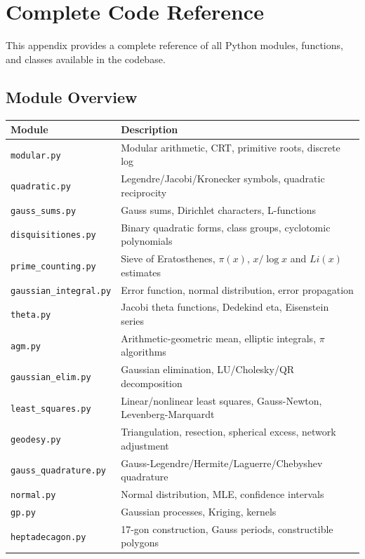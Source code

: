 \chapter{Complete Code Reference}

This appendix provides a complete reference of all Python modules, functions, and classes available in the codebase.

\section{Module Overview}

\begin{table}[H]
\centering
\begin{tabular}{ll}
\toprule
\textbf{Module} & \textbf{Description} \\
\midrule
\texttt{modular.py} & Modular arithmetic, CRT, primitive roots, discrete log \\
\texttt{quadratic.py} & Legendre/Jacobi/Kronecker symbols, quadratic reciprocity \\
\texttt{gauss\_sums.py} & Gauss sums, Dirichlet characters, L-functions \\
\texttt{disquisitiones.py} & Binary quadratic forms, class groups, cyclotomic polynomials \\
\texttt{prime\_counting.py} & Sieve of Eratosthenes, $\pi(x)$, $x/\log x$ and $Li(x)$ estimates \\
\texttt{gaussian\_integral.py} & Error function, normal distribution, error propagation \\
\texttt{theta.py} & Jacobi theta functions, Dedekind eta, Eisenstein series \\
\texttt{agm.py} & Arithmetic-geometric mean, elliptic integrals, $\pi$ algorithms \\
\texttt{gaussian\_elim.py} & Gaussian elimination, LU/Cholesky/QR decomposition \\
\texttt{least\_squares.py} & Linear/nonlinear least squares, Gauss-Newton, Levenberg-Marquardt \\
\texttt{geodesy.py} & Triangulation, resection, spherical excess, network adjustment \\
\texttt{gauss\_quadrature.py} & Gauss-Legendre/Hermite/Laguerre/Chebyshev quadrature \\
\texttt{normal.py} & Normal distribution, MLE, confidence intervals \\
\texttt{gp.py} & Gaussian processes, Kriging, kernels \\
\texttt{heptadecagon.py} & 17-gon construction, Gauss periods, constructible polygons \\

\end{tabular}
\end{table}
